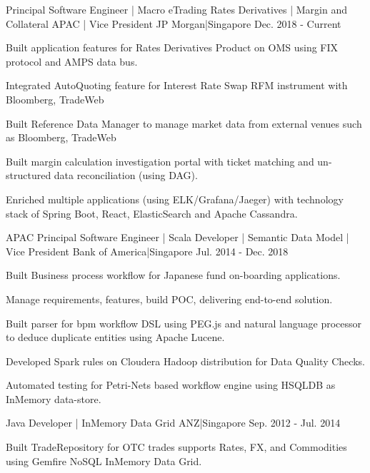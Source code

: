 \begin{cventries}
    {Principal Software Engineer | Macro eTrading Rates Derivatives | Margin and Collateral APAC | Vice President }
    {JP Morgan|Singapore}
    {Dec. 2018 - Current}
    {
      \begin{cvitems}
        \item {Built application features for Rates Derivatives Product on OMS using FIX protocol and AMPS data bus.}
        \item {Integrated AutoQuoting feature for Interest Rate Swap RFM instrument with Bloomberg, TradeWeb}
        \item {Built Reference Data Manager to manage market data from external venues such as Bloomberg, TradeWeb}
        \item {Built margin calculation investigation portal with ticket matching and un-structured data reconciliation (using DAG).}
        \item {Enriched multiple applications (using ELK/Grafana/Jaeger) with technology stack of Spring Boot, React, ElasticSearch and Apache Cassandra.}
      \end{cvitems}
    }
    {APAC Principal Software Engineer | Scala Developer | Semantic Data Model | Vice President}
    {Bank of America|Singapore}
    {Jul. 2014 - Dec. 2018}
    {
      \begin{cvitems}
        \item {Built Business process workflow for Japanese fund on-boarding applications.}
        \item {Manage requirements, features, build POC, delivering end-to-end solution.}
        \item {Built parser for bpm workflow DSL using PEG.js and natural language processor to deduce duplicate entities using Apache Lucene.}
        \item {Developed Spark rules on Cloudera Hadoop distribution for Data Quality Checks.}
        \item {Automated testing for Petri-Nets based workflow engine using HSQLDB as InMemory data-store.}
      \end{cvitems}
    }
    {Java Developer | InMemory Data Grid}
    {ANZ|Singapore}
    {Sep. 2012 - Jul. 2014}
    {
      \begin{cvitems}
        \item {Built TradeRepository for OTC trades  supports Rates, FX, and Commodities using Gemfire NoSQL InMemory Data Grid.}

\end{cvitems}}
\end{cventries}
